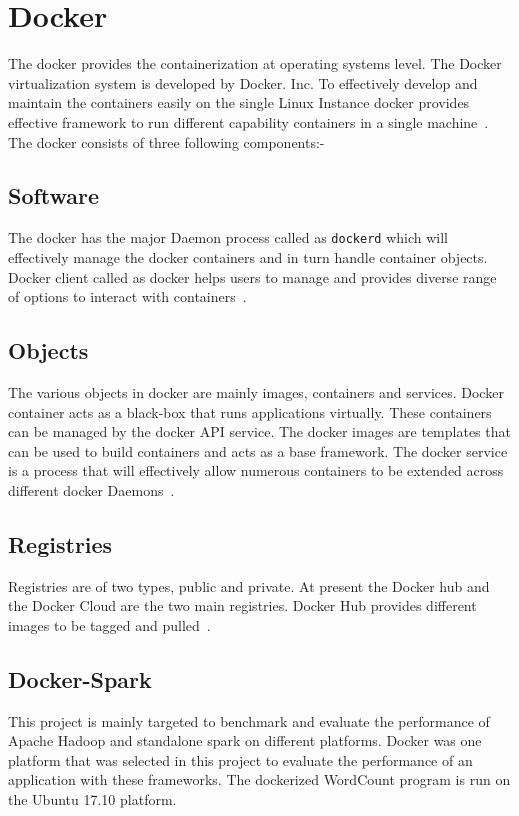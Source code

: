 \section{Docker}

The docker provides the containerization at operating systems level. 
The Docker virtualization system is developed by Docker. Inc. 
To effectively develop and maintain the containers easily
 on the single Linux Instance docker provides effective
 framework to run different capability
 containers in a single machine~\cite{hid-sp18-412-docker_wikepedia}. 
The docker consists of three following components:-

\subsection{Software}
The docker has the major Daemon process called as \verb|dockerd| 
which will effectively manage the docker containers and in turn 
handle container objects. Docker client called as docker
 helps users to manage and provides diverse range of options
 to interact with containers~\cite{hid-sp18-412-docker_wikepedia}. 

\subsection{Objects}
The various objects in docker are mainly images,
 containers and services. 
Docker container acts as a black-box that runs 
applications virtually. These containers can be managed by 
the docker API service. The docker images are templates 
that can be used to build containers and acts as a base
 framework. The docker service is a process
 that will effectively allow numerous containers to be
 extended across
different docker Daemons~\cite{hid-sp18-412-docker_wikepedia}. 

\subsection{Registries}
Registries are of two types, public and private. 
At present the Docker hub and the Docker Cloud are 
the two main registries. Docker 
Hub provides different images to be tagged  
and pulled~\cite{hid-sp18-412-docker_wikepedia}.

\subsection{Docker-Spark}
This project is mainly targeted to benchmark and evaluate 
the performance of Apache Hadoop and standalone 
spark on different platforms. Docker was one
platform that was selected in this project to 
evaluate the performance of an application with these frameworks.
The dockerized WordCount program is run on the Ubuntu 17.10 platform. 

